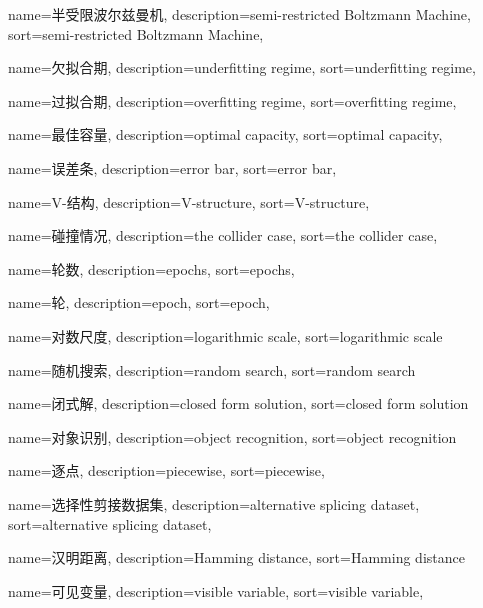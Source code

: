 {
  name=半受限波尔兹曼机,
  description={semi-restricted Boltzmann Machine},
  sort={semi-restricted Boltzmann Machine},
}

{
  name=欠拟合期,
  description={underfitting regime},
  sort={underfitting regime},
}

{
  name=过拟合期,
  description={overfitting regime},
  sort={overfitting regime},
}

{
  name=最佳容量,
  description={optimal capacity},
  sort={optimal capacity},
}

{
  name=误差条,
  description={error bar},
  sort={error bar},
}

{
  name=V-结构,
  description={V-structure},
  sort={V-structure},
}

{
  name=碰撞情况,
  description={the collider case},
  sort={the collider case},
}

{
  name=轮数,
  description={epochs},
  sort={epochs},
}

{
  name=轮,
  description={epoch},
  sort={epoch},
}

{
  name=对数尺度,
  description={logarithmic scale},
  sort={logarithmic scale}
}

{
  name=随机搜索,
  description={random search},
  sort={random search}
}

{
  name=闭式解,
  description={closed form solution},
  sort={closed form solution}
}

{
  name=对象识别,
  description={object recognition},
  sort={object recognition}
}

{
  name=逐点,
  description={piecewise},
  sort={piecewise},
}

{
  name=选择性剪接数据集,
  description={alternative splicing dataset},
  sort={alternative splicing dataset},
}

{
  name=汉明距离,
  description={Hamming distance},
  sort={Hamming distance}
}

{
  name=可见变量,
  description={visible variable},
  sort={visible variable},
}

